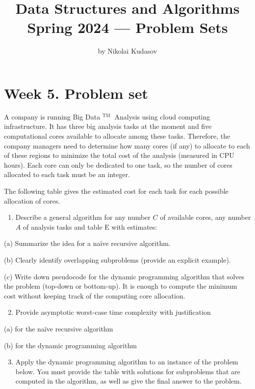 \documentclass[10pt]{article}
\title{Data Structures and Algorithms Spring 2024 — Problem Sets }
\author{by Nikolai Kudasov}
\begin{document}
\maketitle


\section*{Week 5. Problem set}
A company is running Big Data ${ }^{\text {TM }}$ Analysis using cloud computing infrastructure. It has three big analysis tasks at the moment and five computational cores available to allocate among these tasks. Therefore, the company managers need to determine how many cores (if any) to allocate to each of these regions to minimize the total cost of the analysis (measured in CPU hours). Each core can only be dedicated to one task, so the number of cores allocated to each task must be an integer.

The following table gives the estimated cost for each task for each possible allocation of cores.

\begin{enumerate}
  \item Describe a general algorithm for any number $C$ of available cores, any number $A$ of analysis tasks and table $\mathrm{E}$ with estimates:
\end{enumerate}

(a) Summarize the idea for a naïve recursive algorithm.

(b) Clearly identify overlapping subproblems (provide an explicit example).

(c) Write down pseudocode for the dynamic programming algorithm that solves the problem (top-down or bottom-up). It is enough to compute the minimum cost without keeping track of the computing core allocation.

\begin{enumerate}
  \setcounter{enumi}{1}
  \item Provide asymptotic worst-case time complexity with justification
\end{enumerate}

(a) for the naïve recursive algorithm

(b) for the dynamic programming algorithm

\begin{enumerate}
  \setcounter{enumi}{2}
  \item Apply the dynamic programming algorithm to an instance of the problem below. You must provide the table with solutions for subproblems that are computed in the algorithm, as well as give the final answer to the problem.
\end{enumerate}
\end{document}
